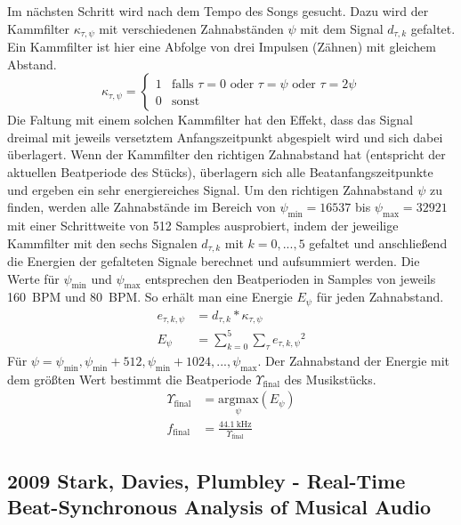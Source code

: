 {{{			%
			Im nächsten Schritt wird nach dem Tempo des Songs gesucht.
			Dazu wird der Kammfilter $\kappa_{\tau, \psi}$ mit verschiedenen Zahnabständen $\psi$ mit dem Signal $d_{\tau, k}$ gefaltet.
			Ein Kammfilter ist hier eine Abfolge von drei Impulsen (Zähnen) mit gleichem Abstand.
			\begin{equation}
				\kappa_{\tau, \psi} =
					\begin{cases}
						1 & \text{falls } \tau = 0 \text{ oder } \tau = \psi \text{ oder } \tau = 2\psi \\
						0 & \text{sonst}
					\end{cases}
			\end{equation}
			Die Faltung mit einem solchen Kammfilter hat den Effekt,
				dass das Signal dreimal mit jeweils versetztem Anfangszeitpunkt abgespielt wird
				und sich dabei überlagert.
			Wenn der Kammfilter den richtigen Zahnabstand hat (entspricht der aktuellen Beatperiode des Stücks),
				überlagern sich alle Beatanfangszeitpunkte
				und ergeben ein sehr energiereiches Signal.
			Um den richtigen Zahnabstand $\psi$ zu finden,
				werden alle Zahnabstände im Bereich von $\psi_\text{min} = \num{16537}$ bis $\psi_\text{max} = \num{32921}$
				mit einer Schrittweite von \num{512} Samples ausprobiert,
				indem der jeweilige Kammfilter mit den sechs Signalen $d_{\tau, k}$ mit $k = 0, ..., 5$ gefaltet
				und anschlie{\ss}end die Energien der gefalteten Signale berechnet und aufsummiert werden.
			Die Werte für $\psi_\text{min}$ und $\psi_\text{max}$ entsprechen den Beatperioden in Samples von jeweils \SI{160}{\ac{BPM}} und \SI{80}{\ac{BPM}}.
			So erhält man eine Energie $E_\psi$ für jeden Zahnabstand.
			\begin{align}
				e_{\tau, k, \psi} &= d_{\tau, k} * \kappa_{\tau, \psi} \\
				E_\psi &= \sum_{k = 0}^5 \sum_\tau {e_{\tau, k, \psi}}^2
			\end{align}
			Für $\psi = \psi_\text{min}, \psi_\text{min} + 512, \psi_\text{min} + 1024, ..., \psi_\text{max}$.
			Der Zahnabstand der Energie mit dem grö{\ss}ten Wert bestimmt die Beatperiode $\Upsilon_\text{final}$ des Musikstücks.
			\begin{align}
				\Upsilon_\text{final} &= \underset{\psi}{\text{argmax}}(E_\psi) \\
				f_\text{final} &= \frac{\SI{44.1}{\kilo\hertz}}{\Upsilon_\text{final}}
			\end{align}
		}
	}

	\subsection{2009 Stark, Davies, Plumbley - Real-Time Beat-Synchronous Analysis of Musical Audio}
	{
}}
